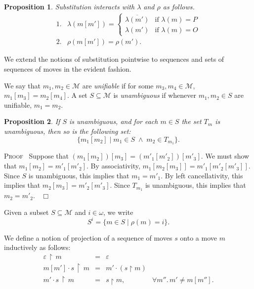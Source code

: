 \documentclass[a4paper,11pt]{article}
\newtheorem{proposition}{Proposition}[section]
\newcommand{\restrict}{{\upharpoonright}}
\newcommand{\MM}{\mathcal{M}}
\newenvironment{proof}{\textsc{Proof}\ }{$\;\; \Box$}
\begin{document}
\begin{proposition}
\label{sublr}
Substitution interacts with $\lambda$ and $\rho$ as follows.
\[ \begin{array}{ll}
1. & \lambda (m[m']) = \left\{ \begin{array}{ll}
\overline{\lambda (m')} & \mbox{if $\lambda (m) = P$} \\
\lambda (m') & \mbox{if $\lambda (m) = O$}
\end{array} \right. \\
2. & \rho (m[m']) = \rho (m') .
\end{array} \]
\end{proposition}

\noindent We extend the notions of substitution pointwise to sequences and sets
of sequences of moves in the evident fashion.

\noindent We say that $m_1 , m_2 \in \MM$ are \emph{unifiable} if for
some $m_3 , m_4
\in \MM$, $m_1 [m_3] = m_2 [m_4]$. A set $S \subseteq \MM$ is
\emph{unambiguous} if whenever $m_1 , m_2 \in S$ are unifiable, $m_1 =
m_2$.

\begin{proposition}
\label{unamb}
If $S$ is unambiguous,
and for each $m \in S$ the set $T_m$ is unambiguous, then so is the
following set:
\[ \{ m_1[m_2] \mid m_1 \in S \; \wedge \; m_2 \in T_{m_1} \} . \]
\end{proposition}
\begin{proof}
Suppose that $(m_1[m_2])[m_3] = (m'_1[m'_2])[m'_3]$. We must show
that $m_1[m_2] = m'_1[m'_2]$. By associativity, $m_1[m_2[m_3]] =
m'_1[m'_2[m'_3]]$. Since $S$ is unambiguous, this implies that
$m_1 = m'_1$. By left cancellativity, this implies that $m_2[m_3]
= m'_2[m'_3]$. Since $T_{m_1}$ is unambiguous, this implies that
$m_2 = m'_2$.
\end{proof}

\noindent Given a subset $S \subseteq \MM$ and $i \in \omega$, we write
\[ S^i = \{ m \in S \mid \rho (m) = i \} . \]

\noindent We define a notion of projection of a sequence of moves $s$
onto a
move $m$ inductively as follows:
\[ \begin{array}{lcll}
\varepsilon \, \restrict \, m & = & \varepsilon & \\
m[m'] \cdot s \, \restrict \, m & = & m' \cdot (s \restrict m) &  \\
m' \cdot s \, \restrict \, m & = & s \restrict m, & \forall m''. \, m' \neq
m[m''].
\end{array} \]
\end{document}

